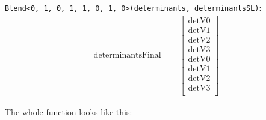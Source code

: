 \documentclass[]{scrartcl}
\begin{document}
\texttt{Blend<0, 1, 0, 1, 1, 0, 1, 0>(determinants, determinantsSL)}:
\begin{align*}
\mathrm{determinantsFinal} 
&=
\begin{bmatrix}
\mathrm{detV0}\\
\mathrm{detV1}\\
\mathrm{detV2}\\
\mathrm{detV3}\\
\mathrm{detV0}\\
\mathrm{detV1}\\
\mathrm{detV2}\\
\mathrm{detV3}\\
\end{bmatrix}
\end{align*}


The whole function looks like this:
\end{document}
